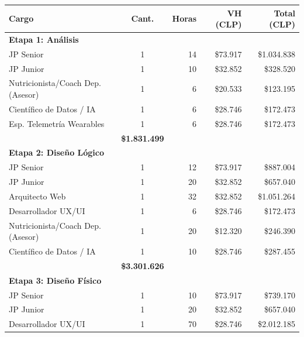 \begin{table}[h!]
    \centering
    \renewcommand{\arraystretch}{1.15}
    \footnotesize
    \begin{tabular}{|l|c|r|r|r|}
        \hline
        \rowcolor[HTML]{EFEFEF}
        \textbf{Cargo} & \textbf{Cant.} & \textbf{Horas} & \textbf{VH (CLP)} & \textbf{Total (CLP)} \\ \hline
        \multicolumn{5}{|l|}{\cellcolor[HTML]{E3F2FD}\textbf{Etapa 1: Análisis}} \\ \hline
        JP Senior & 1 & 14 & \$73.917 & \$1.034.838 \\ \hline
        JP Junior & 1 & 10 & \$32.852 & \$328.520 \\ \hline
        Nutricionista/Coach Dep. (Asesor) & 1 & 6 & \$20.533 & \$123.195 \\ \hline
        Científico de Datos / IA & 1 & 6 & \$28.746 & \$172.473 \\ \hline
        Esp. Telemetría Wearables & 1 & 6 & \$28.746 & \$172.473 \\ \hline
        \rowcolor[HTML]{F3F3F3}
        \multicolumn{4}{|r|}{\textbf{Subtotal Análisis}} & \textbf{\$1.831.499} \\ \hline
        \multicolumn{5}{|l|}{\cellcolor[HTML]{E3F2FD}\textbf{Etapa 2: Diseño Lógico}} \\ \hline
        JP Senior & 1 & 12 & \$73.917 & \$887.004 \\ \hline
        JP Junior & 1 & 20 & \$32.852 & \$657.040 \\ \hline
        Arquitecto Web & 1 & 32 & \$32.852 & \$1.051.264 \\ \hline
        Desarrollador UX/UI & 1 & 6 & \$28.746 & \$172.473 \\ \hline
        Nutricionista/Coach Dep. (Asesor) & 1 & 20 & \$12.320 & \$246.390 \\ \hline
        Científico de Datos / IA & 1 & 10 & \$28.746 & \$287.455 \\ \hline
        \rowcolor[HTML]{F3F3F3}
        \multicolumn{4}{|r|}{\textbf{Subtotal Diseño Lógico}} & \textbf{\$3.301.626} \\ \hline
        \multicolumn{5}{|l|}{\cellcolor[HTML]{E3F2FD}\textbf{Etapa 3: Diseño Físico}} \\ \hline
        JP Senior & 1 & 10 & \$73.917 & \$739.170 \\ \hline
        JP Junior & 1 & 20 & \$32.852 & \$657.040 \\ \hline
        Desarrollador UX/UI & 1 & 70 & \$28.746 & \$2.012.185 \\ \hline

\end{tabular}
\end{table}
